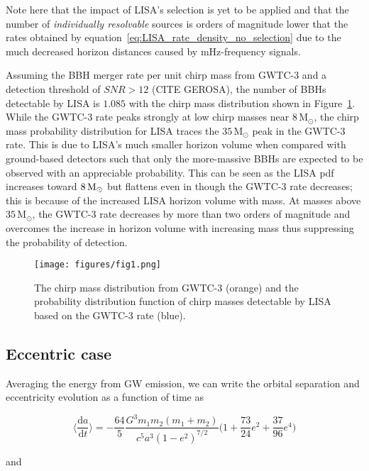\documentclass[twocolumn]{aastex631}
\begin{document}
\noindent Note here that the impact of LISA's selection is yet to be applied and that the number of \emph{individually resolvable} sources is orders of magnitude lower that the rates obtained by equation~\ref{eq:LISA_rate_density_no_selection} due to the much decreased horizon distances caused by mHz-frequency signals. 

Assuming the BBH merger rate per unit chirp mass from GWTC-3 and a detection threshold of $SNR > 12$ (CITE GEROSA), the number of BBHs detectable by LISA is $1.085$ with the chirp mass distribution shown in Figure~\ref{fig:circ_Mdist}. While the GWTC-3 rate peaks strongly at low chirp masses near $8\,\mathrm{M_{\odot}}$, the chirp mass probability distribution for LISA traces the $35\,\mathrm{M_{\odot}}$ peak in the GWTC-3 rate. This is due to LISA's much smaller horizon volume when compared with ground-based detectors such that only the more-massive BBHs are expected to be observed with an appreciable probability. This can be seen as the LISA pdf increases toward $8\,\rm{M_{\odot}}$ but flattens even in though the GWTC-3 rate decreases; this is because of the increased LISA horizon volume with mass. At masses above $35\,\mathrm{M_{\odot}}$, the GWTC-3 rate decreases by more than two orders of magnitude and overcomes the increase in horizon volume with increasing mass thus suppressing the probability of detection.

\begin{figure}
	\texttt{[image: figures/fig1.png]}
    \caption{The chirp mass distribution from GWTC-3 (orange) and the probability distribution function of chirp masses detectable by LISA based on the GWTC-3 rate (blue).}
    \label{fig:circ_Mdist}
\end{figure}


\subsection{Eccentric case}
\label{sec:ecc}
 Averaging the energy from GW emission, we can write the orbital separation and eccentricity evolution as a function of time as

\begin{equation}
    \Big\langle \frac{\mathrm{d}a}{\mathrm{d}t} \Big\rangle = - \frac{64}{5} \frac{G^3 m_1 m_2 (m_1 + m_2)}{c^5 a^3 (1 - e^2)^{7/2}} \Big(1 + \frac{73}{24} e^2 + \frac{37}{96} e^4 \Big)
    \label{eq:dadt}
\end{equation}

\noindent and 
\end{document}
